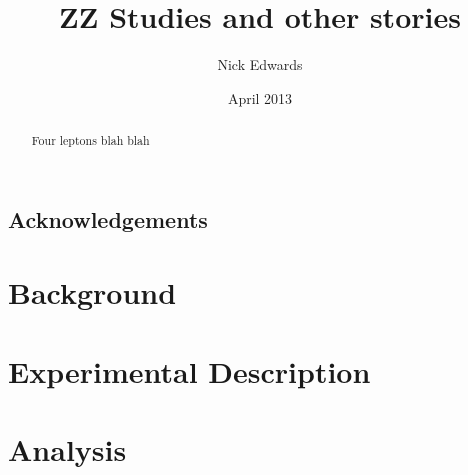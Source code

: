 \documentclass[a4paper,12pt]{report}
\begin{document}
\title{ZZ Studies and other stories}
\author{Nick Edwards}
\date{April 2013}

\maketitle

\tableofcontents
\listoffigures
\listoftables

\chapter*{Acknowledgements}

\begin{abstract}
Four leptons blah blah
\end{abstract}




\part{Background}





\part{Experimental Description}







\part{Analysis}














\end{document}
